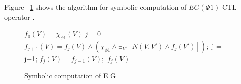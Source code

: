 Figure ~\ref{Symbolic computation of E G} shows the algorithm for symbolic computation of $E G(\Phi 1)$ CTL operator \cite{Baier 2008}. 

\begin{figure}[H]
\begin{framed}
\begin{algorithmic}[1]
\State $f_0(V) = \chi_{\phi 1}(V)$
\State $j = 0$
\Repeat
\State $f_{j+1}(V) = f_j(V) \land (\chi_{\phi 1} \land \exists_{V'}[N(V,V')\land f_j(V')]);$
\State j = j+1;
\Until  $f_j(V) = f_{j-1}(V);$
\State
\Return $f_j(V)$

\EndProcedure
\end{algorithmic}
\end{framed}
\caption{Symbolic computation of E G}
\label{Symbolic computation of E G}
\end{figure}
